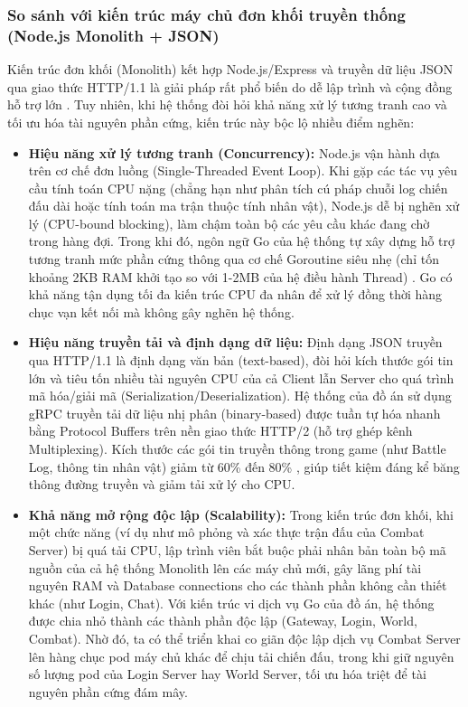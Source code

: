 \documentclass[../Project.tex]{subfiles}
\begin{document}
\subsubsection{So sánh với kiến trúc máy chủ đơn khối truyền thống (Node.js Monolith + JSON)}

Kiến trúc đơn khối (Monolith) kết hợp Node.js/Express và truyền dữ liệu JSON qua giao thức HTTP/1.1 là giải pháp rất phổ biến do dễ lập trình và cộng đồng hỗ trợ lớn \cite{newman2021building, nodejs2026}. Tuy nhiên, khi hệ thống đòi hỏi khả năng xử lý tương tranh cao và tối ưu hóa tài nguyên phần cứng, kiến trúc này bộc lộ nhiều điểm nghẽn:
\begin{itemize}
    \item \textbf{Hiệu năng xử lý tương tranh (Concurrency):} Node.js vận hành dựa trên cơ chế đơn luồng (Single-Threaded Event Loop). Khi gặp các tác vụ yêu cầu tính toán CPU nặng (chẳng hạn như phân tích cú pháp chuỗi log chiến đấu dài hoặc tính toán ma trận thuộc tính nhân vật), Node.js dễ bị nghẽn xử lý (CPU-bound blocking), làm chậm toàn bộ các yêu cầu khác đang chờ trong hàng đợi. Trong khi đó, ngôn ngữ Go của hệ thống tự xây dựng hỗ trợ tương tranh mức phần cứng thông qua cơ chế Goroutine siêu nhẹ (chỉ tốn khoảng 2KB RAM khởi tạo so với 1-2MB của hệ điều hành Thread) \cite{donovan2015go}. Go có khả năng tận dụng tối đa kiến trúc CPU đa nhân để xử lý đồng thời hàng chục vạn kết nối mà không gây nghẽn hệ thống.
    \item \textbf{Hiệu năng truyền tải và định dạng dữ liệu:} Định dạng JSON truyền qua HTTP/1.1 là định dạng văn bản (text-based), đòi hỏi kích thước gói tin lớn và tiêu tốn nhiều tài nguyên CPU của cả Client lẫn Server cho quá trình mã hóa/giải mã (Serialization/Deserialization). Hệ thống của đồ án sử dụng gRPC truyền tải dữ liệu nhị phân (binary-based) được tuần tự hóa nhanh bằng Protocol Buffers trên nền giao thức HTTP/2 (hỗ trợ ghép kênh Multiplexing). Kích thước các gói tin truyền thông trong game (như Battle Log, thông tin nhân vật) giảm từ 60\% đến 80\% \cite{indrasiri2020grpc}, giúp tiết kiệm đáng kể băng thông đường truyền và giảm tải xử lý cho CPU.
    \item \textbf{Khả năng mở rộng độc lập (Scalability):} Trong kiến trúc đơn khối, khi một chức năng (ví dụ như mô phỏng và xác thực trận đấu của Combat Server) bị quá tải CPU, lập trình viên bắt buộc phải nhân bản toàn bộ mã nguồn của cả hệ thống Monolith lên các máy chủ mới, gây lãng phí tài nguyên RAM và Database connections cho các thành phần không cần thiết khác (như Login, Chat). Với kiến trúc vi dịch vụ Go của đồ án, hệ thống được chia nhỏ thành các thành phần độc lập (Gateway, Login, World, Combat). Nhờ đó, ta có thể triển khai co giãn độc lập dịch vụ Combat Server lên hàng chục pod máy chủ khác để chịu tải chiến đấu, trong khi giữ nguyên số lượng pod của Login Server hay World Server, tối ưu hóa triệt để tài nguyên phần cứng đám mây.
\end{itemize}
\end{document}
